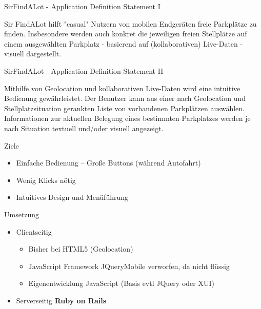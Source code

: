 
\begin{frame}[t,plain]
\titlepage
\end{frame}

\begin{frame}[t]{SirFindALot - Application Definition Statement I}

\Large
\begin{center}Sir FindALot hilft "casual" Nutzern von mobilen Endgeräten freie Parkplätze zu finden. 
Insbesondere werden auch konkret die jeweiligen freien Stellplätze auf einem ausgewählten 
Parkplatz - basierend auf (kollaborativen) Live-Daten - visuell dargestellt.
\end{center}
\end{frame}

\begin{frame}[t]{SirFindALot - Application Definition Statement II}
\Large
\begin{center}Mithilfe von Geolocation und kollaborativen Live-Daten wird eine intuitive Bedienung 
gewährleistet. Der Benutzer kann aus einer nach Geolocation und Stellplatzsituation gerankten 
Liste von vorhandenen Parkplätzen auswählen. Informationen zur aktuellen Belegung eines 
bestimmten Parkplatzes werden je nach Situation textuell und/oder visuell angezeigt. \end{center}

\end{frame}


\begin{frame}[t,fragile]{Ziele}
\begin{itemize}
\item Einfache Bedienung -- Große Buttons (während Autofahrt)
\item Wenig Klicks nötig
\item Intuitives Design und Menüführung
\end{itemize}
\end{frame}

\begin{frame}[t,fragile]{Umsetzung}
\begin{itemize}
	\item Clientseitig
		\begin{itemize}
			\item Bisher bei HTML5 (Geolocation)
			\item JavaScript Framework JQueryMobile verworfen, da nicht flüssig
			\item Eigenentwicklung JavaScript (Basis evtl JQuery oder XUI)
		\end{itemize}
	\item Serverseitig
		\textbf{Ruby on Rails} 
\end{itemize}
\end{frame}

